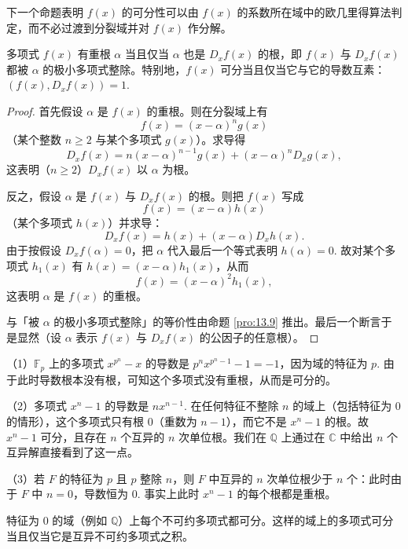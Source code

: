 下一个命题表明 \(f(x)\) 的可分性可以由 \(f(x)\) 的系数所在域中的欧几里得算法判定，而不必过渡到分裂域并对 \(f(x)\) 作分解。

\begin{proposition}\label{pro:13.33}
多项式 \(f(x)\) 有重根 \(\alpha\) 当且仅当 \(\alpha\) 也是 \(D_xf(x)\) 的根，即 \(f(x)\) 与 \(D_xf(x)\) 都被 \(\alpha\) 的极小多项式整除。特别地，\(f(x)\) 可分当且仅当它与它的导数互素：\((f(x), D_xf(x)) = 1\).
\end{proposition}

\begin{proof}
首先假设 \(\alpha\) 是 \(f(x)\) 的重根。则在分裂域上有
\[
f(x) = (x-\alpha)^ng(x)
\]
（某个整数 \(n \geq 2\) 与某个多项式 \(g(x)\)）。求导得
\[
D_xf(x) = n(x-\alpha)^{n-1}g(x)+(x-\alpha)^nD_xg(x),
\]
这表明（\(n \geq 2\)）\(D_xf(x)\) 以 \(\alpha\) 为根。

反之，假设 \(\alpha\) 是 \(f(x)\) 与 \(D_xf(x)\) 的根。则把 \(f(x)\) 写成
\[
f(x) = (x-\alpha)h(x)
\]
（某个多项式 \(h(x)\)）并求导：
\[
D_xf(x) = h(x)+(x-\alpha)D_xh(x).
\]
由于按假设 \(D_xf(\alpha) = 0\)，把 \(\alpha\) 代入最后一个等式表明 \(h(\alpha) = 0\). 故对某个多项式 \(h_1(x)\) 有 \(h(x) = (x-\alpha)h_1(x)\)，从而
\[
f(x) = (x-\alpha)^2h_1(x),
\]
这表明 \(\alpha\) 是 \(f(x)\) 的重根。

与「被 \(\alpha\) 的极小多项式整除」的等价性由命题 \ref{pro:13.9} 推出。最后一个断言于是显然（设 \(\alpha\) 表示 \(f(x)\) 与 \(D_xf(x)\) 的公因子的任意根）。
\end{proof}

\begin{example}
（1）\(\mathbb{F}_p\) 上的多项式 \(x^{p^n}-x\) 的导数是 \(p^nx^{p^n-1}-1 = -1\)，因为域的特征为 \(p\). 由于此时导数根本没有根，可知这个多项式没有重根，从而是可分的。

（2）多项式 \(x^n-1\) 的导数是 \(nx^{n-1}\). 在任何特征不整除 \(n\) 的域上（包括特征为 0 的情形），这个多项式只有根 0（重数为 \(n-1\)），而它不是 \(x^n-1\) 的根。故 \(x^n-1\) 可分，且存在 \(n\) 个互异的 \(n\) 次单位根。我们在 \(\mathbb{Q}\) 上通过在 \(\mathbb{C}\) 中给出 \(n\) 个互异解直接看到了这一点。

（3）若 \(F\) 的特征为 \(p\) 且 \(p\) 整除 \(n\)，则 \(F\) 中互异的 \(n\) 次单位根少于 \(n\) 个：此时由于 \(F\) 中 \(n = 0\)，导数恒为 0. 事实上此时 \(x^n-1\) 的每个根都是重根。
\end{example}

\begin{corollary}\label{cor:13.34}
特征为 0 的域（例如 \(\mathbb{Q}\)）上每个不可约多项式都可分。这样的域上的多项式可分当且仅当它是互异不可约多项式之积。
\end{corollary}

